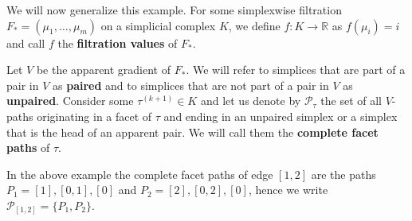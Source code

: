 We will now generalize this example. 
For some simplexwise filtration $F_* = (\mu_1,\dots,\mu_m)$ on a simplicial complex $K$, we define $f:K \rightarrow \mathbb{R}$ as $f(\mu_i) = i$ and
call $f$ the \textbf{filtration values} of $F_*$. 

Let $V$ be the apparent gradient of $F_*$. We will refer to simplices that are part of a pair in $V$ as \textbf{paired} and to simplices that are not part of a pair in $V$ as \textbf{unpaired}. Consider some $\tau^{(k+1)} \in K$ and let us denote by $\mathcal{P}_\tau$ the set of all $V$-paths originating in a facet of $\tau$ and ending in an unpaired simplex or a simplex that is the head of an apparent pair. We will call them the \textbf{complete facet paths} of $\tau$. 

In the above example the complete facet paths of edge $[1,2]$ are the paths $P_1 = [1],[0,1],[0]$ and $P_2 = [2],[0,2],[0]$, hence we write $\mathcal{P}_{[1,2]} = \{P_1,P_2\}$.

